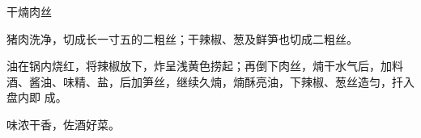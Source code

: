 \begin{recipe}{干煵肉丝}

\ingredients


\cooking

\step 猪肉洗净，切成长一寸五的二粗丝；干辣椒、葱及鲜笋也切成二粗丝。

\step 油在锅内烧红，将辣椒放下，炸呈浅黄色捞起；再倒下肉丝，煵干水气后，加料
酒、酱油、味精、盐，后加笋丝，继续久煵，煵酥亮油，下辣椒、葱丝造匀，扦入盘内即
成。

\notes

味浓干香，佐酒好菜。

\end{recipe}


